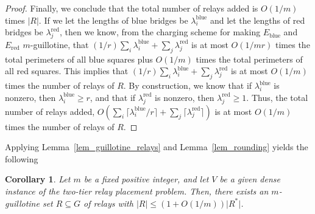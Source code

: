 \documentclass[11pt,a4paper]{article}
\newcommand{\ceil}[1]{\lceil{#1}\rceil}
\newcommand{\s}[1]{{\lvert #1 \rvert}}
\newcommand{\blue}{\text{blue}}
\newcommand{\red}{\text{red}}
\newtheorem{corollary}{Corollary}
\theoremstyle{definition}
\theoremstyle{remark}
\begin{document}
\begin{proof}
Finally, we conclude that the total number of relays added is $O(1/m)$
times $\s{R}$.  If we let the lengths of blue bridges be
$\lambda_i^{\blue}$ and let the lengths of red bridges be
$\lambda_j^{\red}$, then we know, from the charging scheme for making
$E_{\blue}$ and $E_{\red}$ $m$-guillotine, that $(1/r)\sum_i \lambda_i^{\blue} +
\sum_j \lambda_j^{\red}$ is at most $O(1/mr)$ times the total
perimeters of all blue squares plus $O(1/m)$ times the total
perimeters of all red squares.  This implies that $(1/r)\sum_i
\lambda_i^{\blue} + \sum_j \lambda_j^{\red}$ is at most $O(1/m)$ times
the number of relays of $R$.  By construction, we know that if
$\lambda_i^{\blue}$ is nonzero, then $\lambda_i^{\blue}\geq r$, and that
if $\lambda_j^{\red}$ is nonzero, then $\lambda_j^{\red}\geq 1$.  Thus,
the total number of relays added, $O(\sum_i \ceil{\lambda_i^{\blue}/r} +
\sum_j \ceil{\lambda_j^{\red}})$ is at most $O(1/m)$ times the number
of relays of $R$.
\end{proof}


Applying Lemma~\ref{lem_guillotine_relays} and Lemma~\ref{lem_rounding} yields the following

\begin{corollary}
Let $m$ be a fixed positive integer, and let $V$ be a given dense instance of
the two-tier relay placement problem.
Then, there exists an $m$-guillotine
set $R\subseteq G$ of relays with $\s{R}\leq (1+O(1/m))\s{R^*}$.
\end{corollary}
\end{document}

